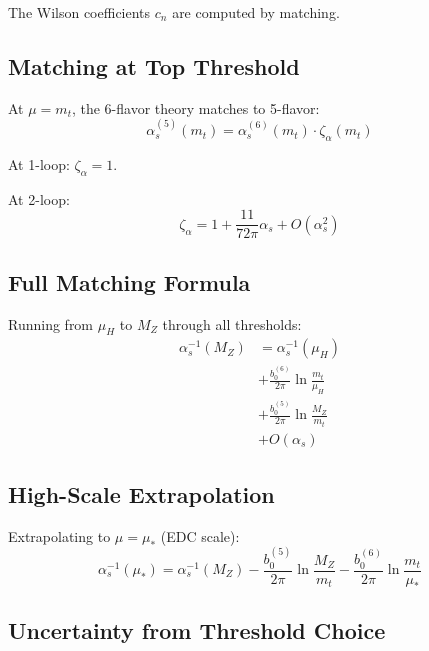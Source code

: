 \documentclass[11pt,a4paper]{article}
\theoremstyle{definition}
\begin{document}
The Wilson coefficients $c_n$ are computed by matching.

\subsection{Matching at Top Threshold}
\label{subsec:top-match-detail}

At $\mu = m_t$, the 6-flavor theory matches to 5-flavor:
\begin{equation}
\label{eq:top-match-eq}
\alpha_s^{(5)}(m_t) = \alpha_s^{(6)}(m_t) \cdot \zeta_\alpha(m_t)
\end{equation}

At 1-loop: $\zeta_\alpha = 1$.

At 2-loop:
\begin{equation}
\label{eq:zeta-2loop}
\zeta_\alpha = 1 + \frac{11}{72\pi}\alpha_s + O(\alpha_s^2)
\end{equation}

\subsection{Full Matching Formula}
\label{subsec:full-matching}

Running from $\mu_H$ to $M_Z$ through all thresholds:
\begin{align}
\label{eq:full-match-1}
\alpha_s^{-1}(M_Z) &= \alpha_s^{-1}(\mu_H) \\
\label{eq:full-match-2}
&+ \frac{b_0^{(6)}}{2\pi}\ln\frac{m_t}{\mu_H} \\
\label{eq:full-match-3}
&+ \frac{b_0^{(5)}}{2\pi}\ln\frac{M_Z}{m_t} \\
\label{eq:full-match-4}
&+ O(\alpha_s)
\end{align}

\subsection{High-Scale Extrapolation}
\label{subsec:high-scale}

Extrapolating to $\mu = \mu_*$ (EDC scale):
\begin{equation}
\label{eq:high-scale-extrap}
\alpha_s^{-1}(\mu_*) = \alpha_s^{-1}(M_Z) - \frac{b_0^{(5)}}{2\pi}\ln\frac{M_Z}{m_t}
  - \frac{b_0^{(6)}}{2\pi}\ln\frac{m_t}{\mu_*}
\end{equation}

\subsection{Uncertainty from Threshold Choice}
\label{subsec:thresh-uncert}
\end{document}
